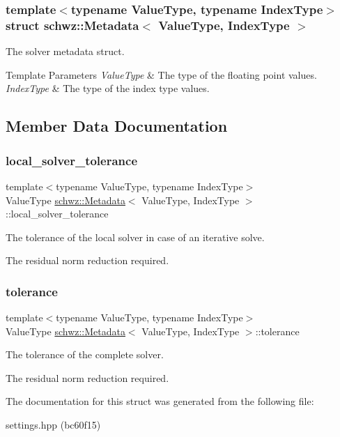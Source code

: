 \subsubsection*{template$<$typename Value\+Type, typename Index\+Type$>$\newline
struct schwz\+::\+Metadata$<$ Value\+Type, Index\+Type $>$}

The solver metadata struct. 


\begin{DoxyTemplParams}{Template Parameters}
{\em Value\+Type} & The type of the floating point values. \\
\hline
{\em Index\+Type} & The type of the index type values. \\
\hline
\end{DoxyTemplParams}


\subsection{Member Data Documentation}
\mbox{\label{structschwz_1_1Metadata_a0fec5924fa99f07cabf560cc461887b5}} 
\subsubsection{\texorpdfstring{local\+\_\+solver\+\_\+tolerance}{local\_solver\_tolerance}}
{\footnotesize\ttfamily template$<$typename Value\+Type, typename Index\+Type$>$ \\
Value\+Type \hyperlink{structschwz_1_1Metadata}{schwz\+::\+Metadata}$<$ Value\+Type, Index\+Type $>$\+::local\+\_\+solver\+\_\+tolerance}



The tolerance of the local solver in case of an iterative solve. 

The residual norm reduction required. \mbox{\label{structschwz_1_1Metadata_a366db94e2a75dbdd82616e0d0b33bb86}} 
\subsubsection{\texorpdfstring{tolerance}{tolerance}}
{\footnotesize\ttfamily template$<$typename Value\+Type, typename Index\+Type$>$ \\
Value\+Type \hyperlink{structschwz_1_1Metadata}{schwz\+::\+Metadata}$<$ Value\+Type, Index\+Type $>$\+::tolerance}



The tolerance of the complete solver. 

The residual norm reduction required. 

The documentation for this struct was generated from the following file\+:\begin{DoxyCompactItemize}
\item 
settings.\+hpp (bc60f15)\end{DoxyCompactItemize}

